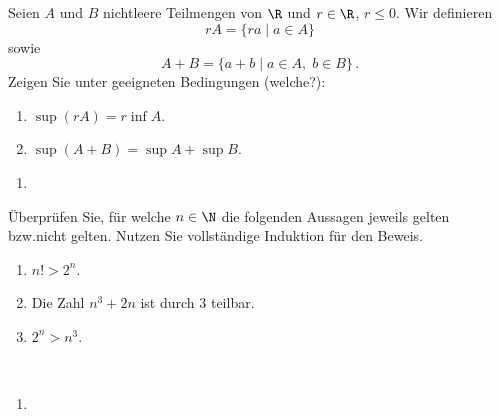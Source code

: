 \begin{aufg}[6 Punkte]
Seien $A$ und $B$ nichtleere Teilmengen von $\R$ und $r\in\R$, $r\leq 0$. Wir definieren 
\[
rA = \lbrace ra \mid a\in A\rbrace
\]
sowie
\[
A+B = \lbrace a+b \mid a\in A, \; b\in B \rbrace\,.
\]
Zeigen Sie unter geeigneten Bedingungen (welche?):
\begin{enumerate}[label=$\mathrm{(\roman*)}$, ref=$\mathrm{\roman*}$]
\item $\sup(rA) = r\inf A$.
\item $\sup(A+B) = \sup A + \sup B$.
\end{enumerate}
\end{aufg}


\bigskip

\begin{lsg}
\begin{enumerate}[label=$\mathrm{(\roman*)}$, ref=$\mathrm{\roman*}$]
\item 
\end{enumerate}
\end{lsg}


\bigskip


\begin{aufg}[6 Punkte] \"Uberpr\"ufen Sie, f\"ur welche $n\in\N$ die folgenden Aussagen jeweils gelten bzw.\@ nicht gelten. Nutzen Sie vollst\"andige Induktion f\"ur den Beweis.
\begin{enumerate}[label=$\mathrm{(\roman*)}$, ref=$\mathrm{\roman*}$]
\item $n!>2^n$.
\item Die Zahl $n^3+2n$ ist durch $3$ teilbar.
\item $2^n > n^3$.
\end{enumerate}
\end{aufg}
 
\bigskip

\begin{lsg}\mbox{ }
\begin{enumerate}[label=$\mathrm{(\roman*)}$, ref=$\mathrm{\roman*}$]
\item 
\end{enumerate}
\end{lsg}
